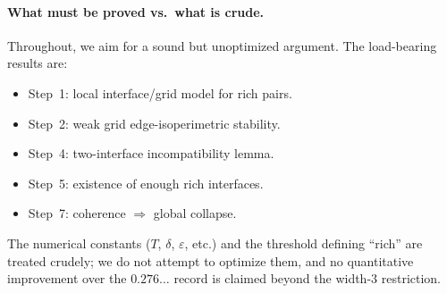 \documentclass[11pt]{article}
\theoremstyle{definition}
\theoremstyle{remark}
\begin{document}
\paragraph{What must be proved vs.\ what is crude.}
Throughout, we aim for a sound but unoptimized argument.  The
load-bearing results are:
\begin{itemize}\setlength{\itemsep}{2pt}
  \item Step~1: local interface/grid model for rich pairs.
  \item Step~2: weak grid edge-isoperimetric stability.
  \item Step~4: two-interface incompatibility lemma.
  \item Step~5: existence of enough rich interfaces.
  \item Step~7: coherence $\Rightarrow$ global collapse.
\end{itemize}
The numerical constants ($T$, $\delta$, $\varepsilon$, etc.) and the
threshold defining ``rich'' are treated crudely; we do not attempt to
optimize them, and no quantitative improvement over the
$0.276\ldots$ record is claimed beyond the width-$3$ restriction.
\end{document}
